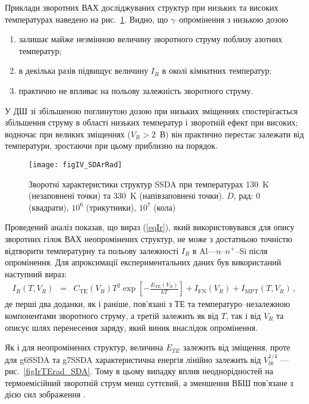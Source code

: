 Приклади зворотних ВАХ досліджуваних структур при низьких та високих температурах наведено на рис.~\ref{figIV_SDArRad}.
Видно, що $\gamma$--опромінення з низькою дозою
\begin{enumerate}[label=\asbuk*),leftmargin=0em,itemindent=1.5em]
\item залишає майже незмінною величину зворотного струму поблизу азотних температур;
\item в декілька разів підвищує величину $I_R$ в околі кімнатних температур;
\item практично не впливає на польову залежність зворотного струму.
\end{enumerate}
У ДШ зі збільшеною поглинутою дозою при низьких зміщеннях спостерігається збільшення струму в області низьких температур і зворотній ефект при високих;
водночас при великих зміщеннях ($V_R>2$~В) він практично перестає залежати від температури, зростаючи при цьому приблизно на порядок.


\begin{figure}
\center
\texttt{[image: figIV\_SDArRad]}
\caption{\label{figIV_SDArRad}
Зворотні характеристики структур SSDA при температурах 130~K (незаповнені точки)
та 330~K (напівзаповнені точки).
$D$, рад: 0 (квадрати), $10^6$ (трикутники), $10^7$ (кола)
}%
\end{figure}

Проведений аналіз показав, що вираз (\ref{eqIr}), який використовувався для опису зворотних гілок ВАХ неопромінених структур,
не може з достатньою точністю відтворити температурну та польову залежності $I_R$ в Al---$n$--$n^+$--Si після опромінення.
Для апроксимації експериментальних даних був використаний наступний вираз:
\begin{eqnarray}
\label{eqIrRad}
I_R(T,V_R)&=&C_\mathrm{TE}(V_R)T^2\exp\left[-\frac{E_\mathrm{TE}(V_R)}{kT}\right]+I_\mathrm{FN}(V_R)+I_\mathrm{MPT}(T,V_R)\,,
\end{eqnarray}
де
перші два доданки, як і раніше,
пов'язані з ТЕ та температуро--незалежною компонентами зворотного струму,
а третій залежить як від $T$, так і від $V_R$ та описує шлях перенесення заряду, який виник внаслідок опромінення.

Як і для неопромінених структур,
величина $E_{TE}$ залежить від зміщення, проте для g6SSDA та g7SSDA характеристична енергія лінійно залежить від $V_{bb}^{1/4}$
 --- рис.~\ref{figIrTErad_SDA}.
Тому в цьому випадку вплив неоднорідностей
на термоемісійний зворотній струм менш суттєвий, а зменшення ВБШ пов’язане з дією сил зображення \cite{Rhoderick1988,Andrews}.

